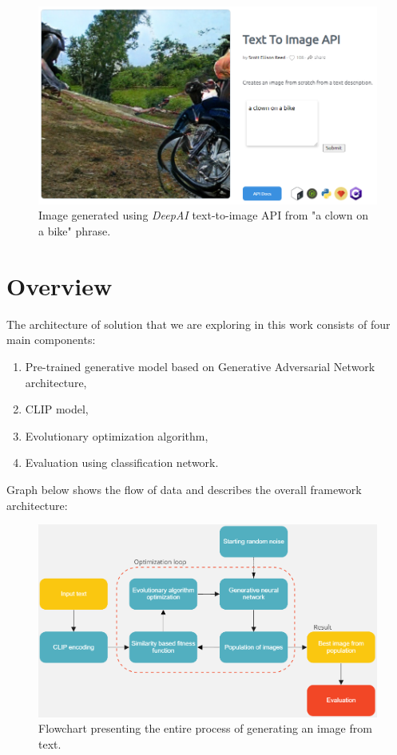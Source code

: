 \documentclass[12pt,a4paper,openany]{book}
\begin{document}
\begin{figure}[H]
    \centering
    \includegraphics[scale=0.6]{figs/deepai.png}
    \caption{Image generated using \textit{DeepAI} \cite{deepai} text-to-image API from "a clown on a bike" phrase.}\label{Fig:deepai}
\end{figure}

\section{Overview}

\noindent The architecture of solution that we are exploring in this work consists of four main components:
\begin{enumerate}
\item Pre-trained generative model based on Generative Adversarial Network architecture,
\item CLIP model,
\item Evolutionary optimization algorithm,
\item Evaluation using classification network.
\end{enumerate}
Graph below shows the flow of data and describes the overall framework architecture:\\


\begin{figure}[H]
    \centering
    \includegraphics[scale=0.6]{figs/flow.png}
    \caption{Flowchart presenting the entire process of generating an image from text.}\label{Fig:flow}
\end{figure}
\end{document}
